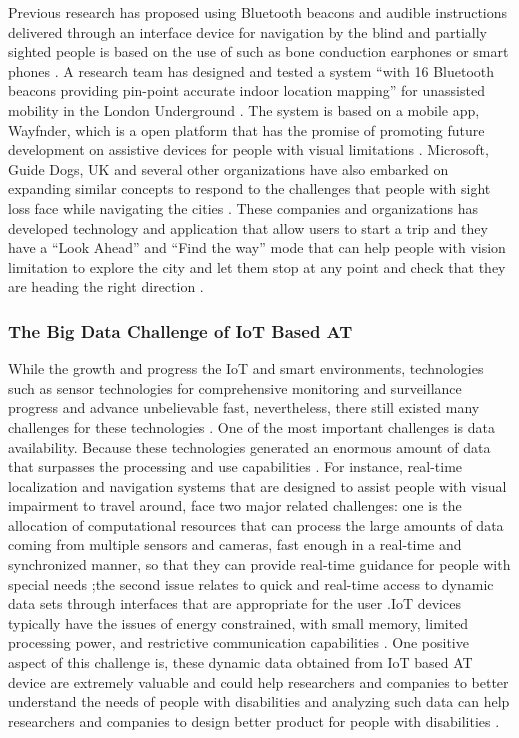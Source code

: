 Previous research has proposed using Bluetooth beacons and audible 
instructions delivered through an interface device for navigation 
by the blind and partially sighted people is based on the use of 
such as bone conduction earphones or smart phones \cite{Barbeau,Shah}. 
A research team has designed and tested a system ``with 16 Bluetooth beacons 
providing pin-point accurate indoor location mapping'' 
for unassisted mobility in the London Underground \cite{Shah}. The system is based on a mobile app, Wayfnder,  which is 
a open platform that has the promise of promoting future 
development on assistive devices for people with visual limitations \cite{Shah}. 
Microsoft, Guide Dogs, UK and several other organizations have also embarked
on expanding similar concepts to respond to the challenges that people with sight
loss face while navigating the cities \cite{Shah}.  These companies and organizations
has developed technology and application that allow users to start a trip and they 
have a ``Look Ahead'' and ``Find the way'' mode that can help people with vision
limitation to explore the city and let them stop at any point and check 
that they are heading the right direction \cite{Barbeau}. 

\subsubsection{The Big Data Challenge of IoT Based AT}
While the growth and progress the IoT and smart
environments, technologies such as sensor technologies for comprehensive
monitoring and surveillance progress and advance unbelievable fast, nevertheless,
there still existed many challenges for these  technologies \cite{Shah}. 
One of the most important challenges is data availability. Because these technologies generated an
enormous amount of data that surpasses the processing and use capabilities \cite{Shah}. For
instance, real-time localization and navigation systems that are designed to assist people 
with visual impairment to travel around, face two major related challenges: one is 
the allocation of computational resources that can process the large
amounts of data coming from multiple sensors and cameras, fast enough in a real-time
and synchronized manner, so that they can provide real-time guidance for people 
with special needs \cite{Shah};the second issue relates to quick and real-time access to
dynamic data sets through interfaces that are appropriate for the user \cite{Shah}.IoT devices 
typically have the issues of energy constrained, with small memory, limited processing 
power, and restrictive communication capabilities \cite{Shah}. One positive aspect of this 
challenge is, these dynamic data obtained from IoT based AT device are extremely 
valuable and could help researchers and companies to better understand the 
needs of people with disabilities and analyzing such data can help researchers 
and companies to design better product for people with disabilities \cite{dewsbury03}.

